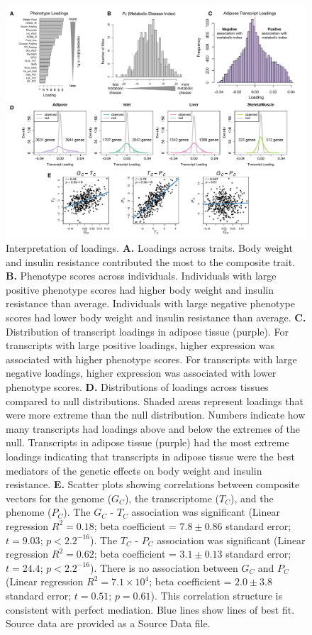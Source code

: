\documentclass[
]{article}
\begin{document}
\begin{figure}[ht!]
\includegraphics[width=\textwidth]{Figures/Fig4_interpretation.pdf} 
\caption{Interpretation of loadings. \textbf{A.} Loadings across traits. 
Body weight and insulin resistance contributed the most 
to the composite trait. \textbf{B.} Phenotype scores across 
individuals. Individuals with large positive phenotype scores 
had higher body weight and insulin resistance than average. 
Individuals with large negative phenotype scores had lower 
body weight and insulin resistance than average. \textbf{C.} 
Distribution of transcript loadings in adipose tissue (purple). 
For transcripts with large positive loadings, higher expression 
was associated with higher phenotype scores. For transcripts 
with large negative loadings, higher expression was associated 
with lower phenotype scores. \textbf{D.} Distributions of loadings 
across tissues compared to null distributions. Shaded areas 
represent loadings that were more extreme than the null 
distribution. Numbers indicate how many transcripts had loadings 
above and below the extremes of the null. Transcripts in adipose 
tissue (purple) had the most extreme loadings indicating 
that transcripts in adipose tissue were the best mediators of the 
genetic effects on body weight and insulin resistance. \textbf{E.} 
Scatter plots showing correlations between composite vectors for 
the genome ($G_C$), the transcriptome ($T_C$), and the phenome 
($P_C$). The $G_C$ - $T_C$ association was significant 
(Linear regression $R^2 = 0.18$;  beta coefficient = $7.8\pm0.86$ 
standard error; $t = 9.03$; $p < 2.2^{-16}$). The $T_C$ - $P_C$ 
association was significant (Linear regression $R^2 = 0.62$;  
beta coefficient = $3.1\pm0.13$ standard error; $t = 24.4$; 
$p < 2.2^{-16}$). There is no association between $G_C$ and $P_C$
(Linear regression $R^2 = 7.1\times10^{4}$;  beta coefficient = 
$2.0\pm3.8$ standard error; $t = 0.51$; $p = 0.61$). This correlation 
structure is consistent with perfect mediation. Blue lines show
lines of best fit. Source data are provided as a Source Data file.
}
\label{fig:interpretation}
\end{figure}
\end{document}
